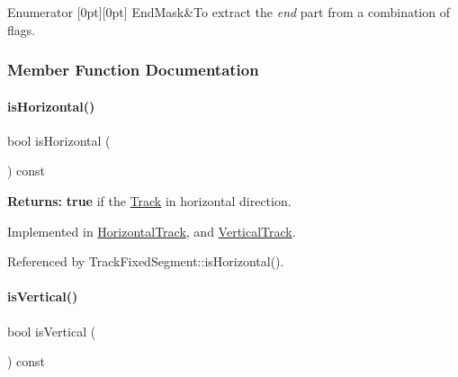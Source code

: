 \begin{DoxyEnumFields}{Enumerator}
[0pt][0pt]{}\mbox{\label{classKite_1_1Track_af4bdc8469c0fee386fc2ff30e0666bcaa0b5a81972d3a6718c3d68199467d2d11}} 
End\+Mask&To extract the {\itshape end} part from a combination of flags. \\
\hline

\end{DoxyEnumFields}


\subsubsection{Member Function Documentation}
\mbox{\label{classKite_1_1Track_a9d3db1f8a5aca58f8f54d291faebf873}} 
\paragraph{\texorpdfstring{is\+Horizontal()}{isHorizontal()}}
{\footnotesize\ttfamily bool is\+Horizontal (\begin{DoxyParamCaption}{ }\end{DoxyParamCaption}) const\hspace{0.3cm}{\ttfamily [pure virtual]}}

{\bfseries Returns\+:} {\bfseries true} if the \hyperlink{classKite_1_1Track}{Track} in horizontal direction. 

Implemented in \hyperlink{classKite_1_1HorizontalTrack_a21b9cefd33ae22e4c2070ad441bdd30b}{Horizontal\+Track}, and \hyperlink{classKite_1_1VerticalTrack_a21b9cefd33ae22e4c2070ad441bdd30b}{Vertical\+Track}.



Referenced by Track\+Fixed\+Segment\+::is\+Horizontal().

\mbox{\label{classKite_1_1Track_a6fa2bf0568a2b295dd7cd1f7207247d5}} 
\paragraph{\texorpdfstring{is\+Vertical()}{isVertical()}}
{\footnotesize\ttfamily bool is\+Vertical (\begin{DoxyParamCaption}{ }\end{DoxyParamCaption}) const\hspace{0.3cm}{\ttfamily [pure virtual]}}

